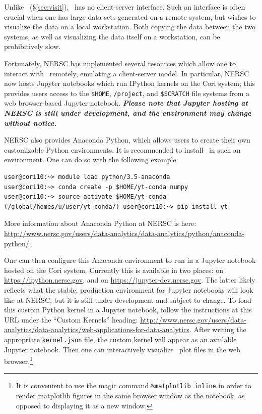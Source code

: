 Unlike \visit\ (\S\ref{sec:visit}), \yt\ has no client-server interface. Such
an interface is often crucial when one has large data sets generated on a
remote system, but wishes to visualize the data on a local workstation. Both
copying the data between the two systems, as well as visualizing the data
itself on a workstation, can be prohibitively slow.

Fortunately, NERSC has implemented several resources which allow one to
interact with \yt\ remotely, emulating a client-server model. In particular,
NERSC now hosts Jupyter notebooks which run IPython kernels on the Cori system;
this provides users access to the \texttt{\$HOME}, \texttt{/project}, and
\texttt{\$SCRATCH} file systems from a web browser-based Jupyter notebook.
\emph{\textbf{Please note that Jupyter hosting at NERSC is still under
development, and the environment may change without notice.}}

NERSC also provides Anaconda Python, which allows users to create their own
customizable Python environments. It is recommended to install \yt\ in such an
environment. One can do so with the following example:

\begin{lstlisting}
user@cori10:~> module load python/3.5-anaconda
user@cori10:~> conda create -p $HOME/yt-conda numpy
user@cori10:~> source activate $HOME/yt-conda
(/global/homes/u/user/yt-conda/) user@cori10:~> pip install yt
\end{lstlisting}

More information about Anaconda Python at NERSC is here:
\url{http://www.nersc.gov/users/data-analytics/data-analytics/python/anaconda-python/}.

One can then configure this Anaconda environment to run in a Jupyter notebook
hosted on the Cori system. Currently this is available in two places: on
\url{https://ipython.nersc.gov}, and on \url{https://jupyter-dev.nersc.gov}.
The latter likely reflects what the stable, production environment for Jupyter
notebooks will look like at NERSC, but it is still under development and
subject to change. To load this custom Python kernel in a Jupyter notebook,
follow the instructions at this URL under the ``Custom Kernels'' heading:
\url{http://www.nersc.gov/users/data-analytics/data-analytics/web-applications-for-data-analytics}.
After writing the appropriate \texttt{kernel.json} file, the custom kernel will
appear as an available Jupyter notebook. Then one can interactively visualize
\amrex\ plot files in the web browser.\footnote{It is convenient to use the
magic command \texttt{\%matplotlib inline} in order to render matplotlib
figures in the same browser window as the notebook, as opposed to displaying it
as a new window.}

